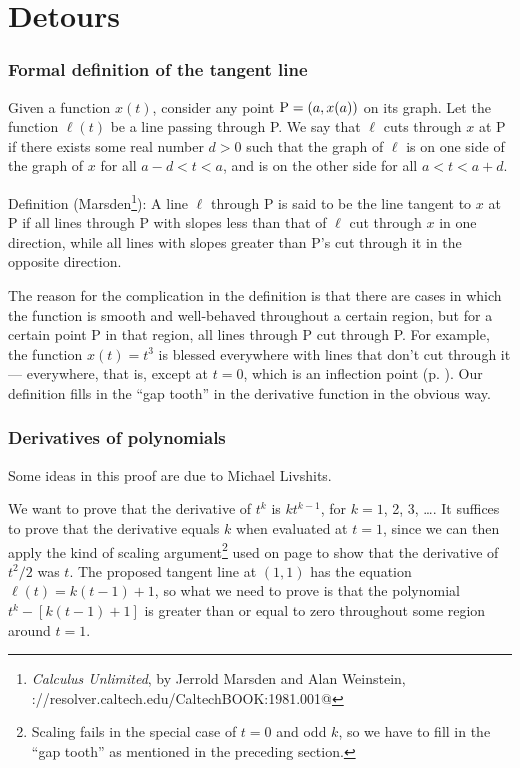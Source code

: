 \chapter{Detours}

\newcommand{\detour}[2]{\subsection{#2}\label{detour:#1}}

\vfill

\detour{def-tangent}{Formal definition of the tangent line}

Given a function $x(t)$, consider any point $\textup{P}=(a,x(a))$ on its graph.
Let the function $\ell(t)$ be a line passing through P.
We say that $\ell$ cuts through $x$ at P if
there exists some real number $d>0$ such that
the graph of $\ell$ is on one side of the graph of $x$ for
all $a-d < t < a$, and is on the other side for all $a < t < a+d$.

Definition (Marsden\footnote{\emph{Calculus Unlimited}, by Jerrold
Marsden and Alan Weinstein, \verb@http://resolver.caltech.edu/CaltechBOOK:1981.001@}): A line $\ell$ through P is said to be the  line tangent to $x$ at P if all
lines through P with slopes less than that of $\ell$ cut through $x$
in one direction, while all lines with slopes greater than P's cut through
it in the opposite direction.

The reason for the complication in the definition is that 
there are cases in which the function is smooth and well-behaved throughout a certain
region, but for a certain point P in that region,
all lines through P cut through P.
For example, the function $x(t)=t^3$ is blessed everywhere with lines that don't
cut through it --- everywhere, that is,
except at $t=0$,
which is an inflection point (p. \pageref{inflection}).
Our definition fills in the
``gap tooth'' in the derivative function in the obvious way.

\pagebreak

\detour{polynomial-proof}{Derivatives of polynomials}

Some ideas in this proof are due to Michael Livshits.

We want to prove that the derivative of $t^k$ is $kt^{k-1}$, for $k=1$, 2, 3, \ldots. It suffices to
prove that the derivative equals $k$ when evaluated at $t=1$, since we can
then apply the kind of scaling argument\footnote{Scaling fails in the special case of $t=0$ and odd $k$,
so we have to fill in the ``gap tooth''
as mentioned in the preceding section.} used on page \pageref{scaling} to
show that the derivative of $t^2/2$ was $t$. The proposed tangent line at $(1,1)$
has the equation $\ell(t)=k(t-1)+1$, so what we need to prove is that
the polynomial $t^k-[k(t-1)+1]$ is greater than or equal to zero throughout some
region around $t=1$.


